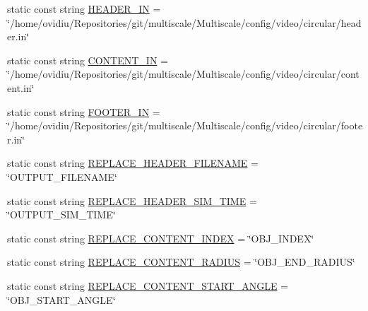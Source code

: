 \begin{DoxyCompactItemize}
\item 
static const string \hyperlink{classmultiscale_1_1video_1_1PolarGnuplotScriptGenerator_acd5fb0e27c9f7857d68b7ec9cb62fb74}{\-H\-E\-A\-D\-E\-R\-\_\-\-I\-N} = \char`\"{}/home/ovidiu/\-Repositories/git/multiscale/\-Multiscale/config/video/circular/header.\-in\char`\"{}
\item 
static const string \hyperlink{classmultiscale_1_1video_1_1PolarGnuplotScriptGenerator_ad8fb67fe439899d85924bd7339b7d08c}{\-C\-O\-N\-T\-E\-N\-T\-\_\-\-I\-N} = \char`\"{}/home/ovidiu/\-Repositories/git/multiscale/\-Multiscale/config/video/circular/content.\-in\char`\"{}
\item 
static const string \hyperlink{classmultiscale_1_1video_1_1PolarGnuplotScriptGenerator_aae225d7380fd7815efa1aed69087e6b0}{\-F\-O\-O\-T\-E\-R\-\_\-\-I\-N} = \char`\"{}/home/ovidiu/\-Repositories/git/multiscale/\-Multiscale/config/video/circular/footer.\-in\char`\"{}
\item 
static const string \hyperlink{classmultiscale_1_1video_1_1PolarGnuplotScriptGenerator_af5f0a7c41016915eaa5756695f17fd4a}{\-R\-E\-P\-L\-A\-C\-E\-\_\-\-H\-E\-A\-D\-E\-R\-\_\-\-F\-I\-L\-E\-N\-A\-M\-E} = \char`\"{}\-O\-U\-T\-P\-U\-T\-\_\-\-F\-I\-L\-E\-N\-A\-M\-E\char`\"{}
\item 
static const string \hyperlink{classmultiscale_1_1video_1_1PolarGnuplotScriptGenerator_ab06a56e8ac6c117d9a3d1279bd114941}{\-R\-E\-P\-L\-A\-C\-E\-\_\-\-H\-E\-A\-D\-E\-R\-\_\-\-S\-I\-M\-\_\-\-T\-I\-M\-E} = \char`\"{}\-O\-U\-T\-P\-U\-T\-\_\-\-S\-I\-M\-\_\-\-T\-I\-M\-E\char`\"{}
\item 
static const string \hyperlink{classmultiscale_1_1video_1_1PolarGnuplotScriptGenerator_a0899b28bb340224529c005d262ffb09f}{\-R\-E\-P\-L\-A\-C\-E\-\_\-\-C\-O\-N\-T\-E\-N\-T\-\_\-\-I\-N\-D\-E\-X} = \char`\"{}\-O\-B\-J\-\_\-\-I\-N\-D\-E\-X\char`\"{}
\item 
static const string \hyperlink{classmultiscale_1_1video_1_1PolarGnuplotScriptGenerator_a2fcfd2afdf3aa1f35b18fc04946f40d2}{\-R\-E\-P\-L\-A\-C\-E\-\_\-\-C\-O\-N\-T\-E\-N\-T\-\_\-\-R\-A\-D\-I\-U\-S} = \char`\"{}\-O\-B\-J\-\_\-\-E\-N\-D\-\_\-\-R\-A\-D\-I\-U\-S\char`\"{}
\item 
static const string \hyperlink{classmultiscale_1_1video_1_1PolarGnuplotScriptGenerator_acb8550fbb7a7f199d01d77622b054e10}{\-R\-E\-P\-L\-A\-C\-E\-\_\-\-C\-O\-N\-T\-E\-N\-T\-\_\-\-S\-T\-A\-R\-T\-\_\-\-A\-N\-G\-L\-E} = \char`\"{}\-O\-B\-J\-\_\-\-S\-T\-A\-R\-T\-\_\-\-A\-N\-G\-L\-E\char`\"{}
\item 

\end{DoxyCompactItemize}
